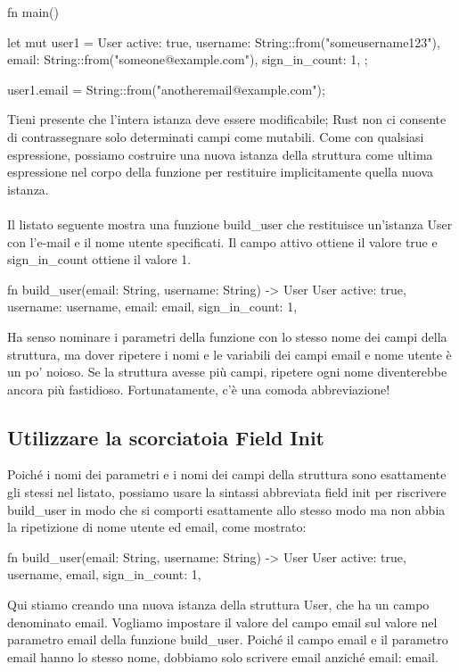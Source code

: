 \documentclass[11pt,a4paper]{article}
\begin{document}
\begin{rust}
fn main() {
    let mut user1 = User {
        active: true,
        username: String::from("someusername123"),
        email: String::from("someone@example.com"),
        sign_in_count: 1,
    };

    user1.email = String::from("anotheremail@example.com");
}
\end{rust}
Tieni presente che l'intera istanza deve essere modificabile; Rust non ci consente di contrassegnare solo determinati campi come mutabili. Come con qualsiasi espressione, possiamo costruire una nuova istanza della struttura come ultima espressione nel corpo della funzione per restituire implicitamente quella nuova istanza.\\
\\
Il listato seguente mostra una funzione build\_user che restituisce un'istanza User con l'e-mail e il nome utente specificati. Il campo attivo ottiene il valore true e sign\_in\_count ottiene il valore 1.
\begin{rust}
fn build_user(email: String, username: String) -> User {
    User {
        active: true,
        username: username,
        email: email,
        sign_in_count: 1,
    }
}
\end{rust}
Ha senso nominare i parametri della funzione con lo stesso nome dei campi della struttura, ma dover ripetere i nomi e le variabili dei campi email e nome utente è un po' noioso. Se la struttura avesse più campi, ripetere ogni nome diventerebbe ancora più fastidioso. Fortunatamente, c’è una comoda abbreviazione!

\subsection{Utilizzare la scorciatoia Field Init}

Poiché i nomi dei parametri e i nomi dei campi della struttura sono esattamente gli stessi nel listato, possiamo usare la sintassi abbreviata field init per riscrivere build\_user in modo che si comporti esattamente allo stesso modo ma non abbia la ripetizione di nome utente ed email, come mostrato:
\begin{rust}
fn build_user(email: String, username: String) -> User {
    User {
        active: true,
        username,
        email,
        sign_in_count: 1,
    }
}
\end{rust}

Qui stiamo creando una nuova istanza della struttura User, che ha un campo denominato email. Vogliamo impostare il valore del campo email sul valore nel parametro email della funzione build\_user. Poiché il campo email e il parametro email hanno lo stesso nome, dobbiamo solo scrivere email anziché email: email.
\end{document}
